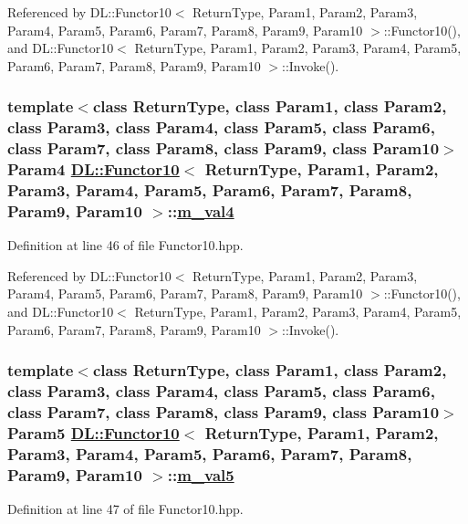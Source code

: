 Referenced by DL::Functor10$<$ Return\-Type, Param1, Param2, Param3, Param4, Param5, Param6, Param7, Param8, Param9, Param10 $>$::Functor10(), and DL::Functor10$<$ Return\-Type, Param1, Param2, Param3, Param4, Param5, Param6, Param7, Param8, Param9, Param10 $>$::Invoke().\hypertarget{classDL_1_1Functor10_r4}{
\subsubsection[m\_\-val4]{\setlength{\rightskip}{0pt plus 5cm}template$<$class Return\-Type, class Param1, class Param2, class Param3, class Param4, class Param5, class Param6, class Param7, class Param8, class Param9, class Param10$>$ Param4 \hyperlink{classDL_1_1Functor10}{DL::Functor10}$<$ Return\-Type, Param1, Param2, Param3, Param4, Param5, Param6, Param7, Param8, Param9, Param10 $>$::\hyperlink{classDL_1_1Functor10_r4}{m\_\-val4}}}
\label{classDL_1_1Functor10_r4}




Definition at line 46 of file Functor10.hpp.

Referenced by DL::Functor10$<$ Return\-Type, Param1, Param2, Param3, Param4, Param5, Param6, Param7, Param8, Param9, Param10 $>$::Functor10(), and DL::Functor10$<$ Return\-Type, Param1, Param2, Param3, Param4, Param5, Param6, Param7, Param8, Param9, Param10 $>$::Invoke().\hypertarget{classDL_1_1Functor10_r5}{
\subsubsection[m\_\-val5]{\setlength{\rightskip}{0pt plus 5cm}template$<$class Return\-Type, class Param1, class Param2, class Param3, class Param4, class Param5, class Param6, class Param7, class Param8, class Param9, class Param10$>$ Param5 \hyperlink{classDL_1_1Functor10}{DL::Functor10}$<$ Return\-Type, Param1, Param2, Param3, Param4, Param5, Param6, Param7, Param8, Param9, Param10 $>$::\hyperlink{classDL_1_1Functor10_r5}{m\_\-val5}}}
\label{classDL_1_1Functor10_r5}




Definition at line 47 of file Functor10.hpp.

